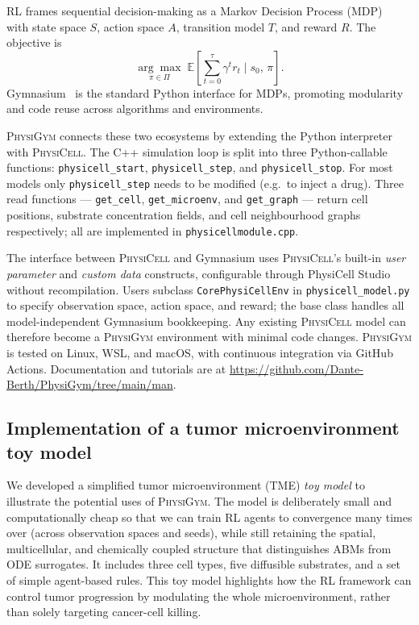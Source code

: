 \documentclass{article}
\newcommand{\physigym}{\textsc{PhysiGym}}
\newcommand{\physicell}{\textsc{PhysiCell}}
\begin{document}
RL frames sequential decision-making as a Markov Decision Process
(MDP)~\citep{bellman1957markovian, puterman2014markov} with state space $S$,
action space $A$, transition model $T$, and reward $R$.
The objective is
\[
  \underset{\pi\in\Pi}{\arg\max}\;
  \mathbb{E}\!\left[\sum_{t=0}^{\tau}\gamma^t r_t \mid s_0,\,\pi\right].
\]
Gymnasium~\citep{towers2024gymnasium} is the standard Python interface for MDPs,
promoting modularity and code reuse across algorithms and environments.

\physigym{} connects these two ecosystems by extending the Python
interpreter~\citep{rossum1995extending, psf2024extending} with \physicell{}.
The C++ simulation loop is split into three Python-callable functions:
\texttt{physicell\_start}, \texttt{physicell\_step}, and
\texttt{physicell\_stop}. For most models only \texttt{physicell\_step} needs
to be modified (e.g.\ to inject a drug). Three read functions —
\texttt{get\_cell}, \texttt{get\_microenv}, and \texttt{get\_graph} — return
cell positions, substrate concentration fields, and cell neighbourhood graphs
respectively; all are implemented in \texttt{physicellmodule.cpp}.

The interface between \physicell{} and Gymnasium uses \physicell{}'s built-in
\emph{user parameter} and \emph{custom data} constructs, configurable through
PhysiCell Studio~\citep{heiland2024physicellstudio} without recompilation.
Users subclass \texttt{CorePhysiCellEnv} in \texttt{physicell\_model.py} to
specify observation space, action space, and reward; the base class handles
all model-independent Gymnasium bookkeeping.
Any existing \physicell{} model can therefore become a \physigym{} environment
with minimal code changes.
\physigym{} is tested on Linux, WSL, and macOS, with continuous integration via
GitHub Actions. Documentation and tutorials are at
\url{https://github.com/Dante-Berth/PhysiGym/tree/main/man}.

\subsection{Implementation of a tumor microenvironment toy model}
\label{sec:model}

We developed a simplified tumor microenvironment (TME) \emph{toy model} to
illustrate the potential uses of \physigym{}. The model is deliberately small
and computationally cheap so that we can train RL agents to convergence many
times over (across observation spaces and seeds), while still retaining the
spatial, multicellular, and chemically coupled structure that distinguishes
ABMs from ODE surrogates. It includes three cell types, five diffusible
substrates, and a set of simple agent-based rules. This toy model highlights how
the RL framework can control tumor progression by modulating the whole
microenvironment, rather than solely targeting cancer-cell killing.
\end{document}
